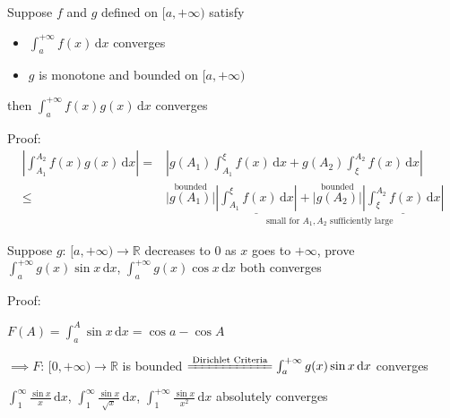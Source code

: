 \begin{theorem}
    Suppose $f$ and $g$ defined on $[a,+\infty)$ satisfy
    \begin{itemize}
        \item $\int_a^{+\infty}f(x)\,\mathrm{d}x$ converges
        \item $g$ is monotone and bounded on $[a,+\infty)$
    \end{itemize}
    then $\int_a^{+\infty}f(x)g(x)\,\mathrm{d}x$ converges
\end{theorem}

Proof:
\begin{align*}
    \left|\int_{A_1}^{A_2}f(x)g(x)\,\mathrm{d}x\right|= & \left|g(A_1)\int_{A_1}^{\xi}f(x)\,\mathrm{d}x+g(A_2)\int_{\xi}^{A_2}f(x)\,\mathrm{d}x\right|                                                                                                                                                                              \\
    \leq                                                & \overset{\text{bounded}}{\left|g(A_1)\right|}\underset{\text{small for $A_1,A_2$ sufficiently large}}{\underline{\left|\int_{A_1}^{\xi}f(x)\,\mathrm{d}x\right|}+\overset{\text{bounded}}{\left|g(A_2)\right|}\underline{\left|\int_{\xi}^{A_2}f(x)\,\mathrm{d}x\right|}}
\end{align*}

\begin{example}
    Suppose $g:\,[a,+\infty)\to\mathbb{R}$ decreases to $0$ as $x$ goes to $+\infty$, prove $\int_a^{+\infty}g(x)\sin x\,\mathrm{d}x$, $\int_a^{+\infty}g(x)\cos x\,\mathrm{d}x$ both converges

    Proof:

    $F(A)=\int_a^A\sin x\,\mathrm{d}x=\cos a-\cos A$

    $\implies F:\,[0,+\infty)\to\mathbb{R}$ is bounded $\xlongequal{\text{Dirichlet Criteria}}\int_a^{+\infty}g(x)\sin x\,\mathrm{d}x$ converges

    \begin{example}
        $\int_1^{\infty}\frac{\sin x}{x}\,\mathrm{d}x$, $\int_1^{\infty}\frac{\sin x}{\sqrt{x}}\,\mathrm{d}x$, $\int_1^{+\infty}\frac{\sin x}{x^2}\,\mathrm{d}x$ absolutely converges
    \end{example}
\end{example}

